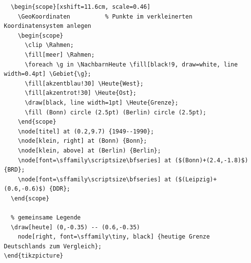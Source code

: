 \begin{lstlisting}[style=latex]
  % ================= 3) 1949–1990: BRD und DDR =========================
  \begin{scope}[xshift=11.6cm, scale=0.46]
    \GeoKoordinaten          % Punkte im verkleinerten Koordinatensystem anlegen
    \begin{scope}
      \clip \Rahmen;
      \fill[meer] \Rahmen;
      \foreach \g in \NachbarnHeute \fill[black!9, draw=white, line width=0.4pt] \Gebiet{\g};
      \fill[akzentblau!30] \Heute{West};
      \fill[akzentrot!30] \Heute{Ost};
      \draw[black, line width=1pt] \Heute{Grenze};
      \fill (Bonn) circle (2.5pt) (Berlin) circle (2.5pt);
    \end{scope}
    \node[titel] at (0.2,9.7) {1949--1990};
    \node[klein, right] at (Bonn) {Bonn};
    \node[klein, above] at (Berlin) {Berlin};
    \node[font=\sffamily\scriptsize\bfseries] at ($(Bonn)+(2.4,-1.8)$) {BRD};
    \node[font=\sffamily\scriptsize\bfseries] at ($(Leipzig)+(0.6,-0.6)$) {DDR};
  \end{scope}

  % gemeinsame Legende
  \draw[heute] (0,-0.35) -- (0.6,-0.35)
    node[right, font=\sffamily\tiny, black] {heutige Grenze Deutschlands zum Vergleich};
\end{tikzpicture}
\end{lstlisting}

